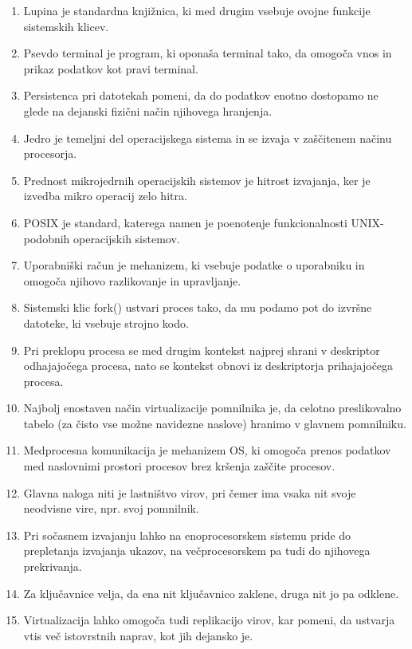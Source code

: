 \documentclass{book}
\begin{document}
\begin{enumerate}
    \item Lupina je standardna knjižnica, ki med drugim vsebuje ovojne funkcije sistemskih klicev.
    \item Psevdo terminal je program, ki oponaša terminal tako, da omogoča vnos in prikaz podatkov kot pravi terminal.
    \item Persistenca pri datotekah pomeni, da do podatkov enotno dostopamo ne glede na dejanski fizični način njihovega hranjenja.
    \item Jedro je temeljni del operacijskega sistema in se izvaja v zaščitenem načinu procesorja.
    \item Prednost mikrojedrnih operacijskih sistemov je hitrost izvajanja, ker je izvedba mikro operacij zelo hitra.
    \item POSIX je standard, katerega namen je poenotenje funkcionalnosti UNIX-podobnih operacijskih sistemov.
    \item Uporabniški račun je mehanizem, ki vsebuje podatke o uporabniku in omogoča njihovo razlikovanje in upravljanje.
    \item Sistemski klic fork() ustvari proces tako, da mu podamo pot do izvršne datoteke, ki vsebuje strojno kodo.
    \item Pri preklopu procesa se med drugim kontekst najprej shrani v deskriptor odhajajočega procesa, nato se kontekst obnovi iz deskriptorja prihajajočega procesa.
    \item Najbolj enostaven način virtualizacije pomnilnika je, da celotno preslikovalno tabelo (za čisto vse možne navidezne naslove) hranimo v glavnem pomnilniku.
    \item Medprocesna komunikacija je mehanizem OS, ki omogoča prenos podatkov med naslovnimi prostori procesov brez kršenja zaščite procesov.
    \item Glavna naloga niti je lastništvo virov, pri čemer ima vsaka nit svoje neodvisne vire, npr. svoj pomnilnik.
    \item Pri sočasnem izvajanju lahko na enoprocesorskem sistemu pride do prepletanja izvajanja ukazov, na večprocesorskem pa tudi do njihovega prekrivanja.
    \item Za ključavnice velja, da ena nit ključavnico zaklene, druga nit jo pa odklene.
    \item Virtualizacija lahko omogoča tudi replikacijo virov, kar pomeni, da ustvarja vtis več istovrstnih naprav, kot jih dejansko je.
\end{enumerate}
\end{document}
